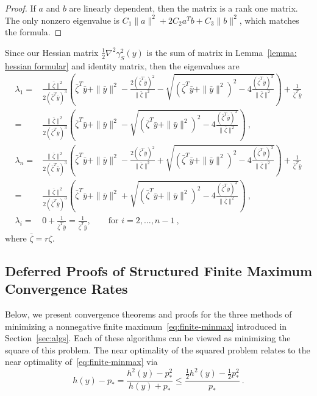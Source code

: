 \documentclass[sn-mathphys,Numbered]{sn-jnl}%
\begin{document}
\begin{appendices}
{\begin{proof}
    If $a$ and $b$ are linearly dependent, then the matrix is a rank one matrix. The only nonzero eigenvalue is $ C_1\|a\|^2+2C_2a^Tb+C_3\|b\|^2$, which matches the formula.
\end{proof}
Since our Hessian matrix $\frac{1}{2}\nabla ^2 \gamma_S^2(y)$ is the sum of matrix in Lemma~\ref{lemma: hessian formular} and identity matrix, then the eigenvalues are
\begin{align*}
    \lambda_1 =&\frac{\|\bar \zeta\|^2}{2(\bar \zeta^T \bar y)^3}\left(\bar \zeta^T \bar y+\|\bar y\|^2-\frac{2(\bar \zeta ^T \bar y)^2}{\|\bar \zeta\|^2}-\sqrt{(\bar \zeta ^T\bar y+\|\bar y\|^2)^2-4\frac{(\bar \zeta^T \bar y)^3}{\|\bar \zeta\|^2}}\right)+\frac{1}{\bar \zeta^T \bar y}  \\
    =&\frac{\|\bar \zeta\|^2}{2(\bar \zeta^T \bar y)^3}\left(\bar \zeta^T \bar y+\|\bar y\|^2-\sqrt{(\bar \zeta ^T\bar y+\|\bar y\|^2)^2-4\frac{(\bar \zeta^T \bar y)^3}{\|\bar \zeta\|^2}}\right) \ , \\
    \lambda_n =& \frac{\|\bar \zeta\|^2}{2(\bar \zeta^T \bar y)^3}\left(\bar \zeta^T \bar y+\|\bar y\|^2-\frac{2(\bar \zeta ^T \bar y)^2}{\|\bar \zeta\|^2}+\sqrt{(\bar \zeta ^T\bar y+\|\bar y\|^2)^2-4\frac{(\bar \zeta^T \bar y)^3}{\|\bar \zeta\|^2}}\right)+\frac{1}{\bar \zeta^T \bar y} \\
    =&\frac{\|\bar \zeta\|^2}{2(\bar \zeta^T \bar y)^3}\left(\bar \zeta^T \bar y+\|\bar y\|^2+\sqrt{(\bar \zeta ^T\bar y+\|\bar y\|^2)^2-4\frac{(\bar \zeta^T \bar y)^3}{\|\bar \zeta\|^2}}\right) \ , \\
    \lambda_i=& 0 +\frac{1}{\bar \zeta^T \bar y} =\frac{1}{\bar \zeta^T \bar y}, \qquad \text{for }i=2,...,n-1 \ ,
\end{align*}
where $\bar \zeta = r\zeta$.

\subsection{Deferred Proofs of Structured Finite Maximum Convergence Rates}\label{app:convergence-proofs}
Below, we present convergence theorems and proofs for the three methods of minimizing a nonnegative finite maximum~\eqref{eq:finite-minmax} introduced in Section~\ref{sec:algs}. Each of these algorithms can be viewed as minimizing the square of this problem. The near optimality of the squared problem relates to the near optimality of~\eqref{eq:finite-minmax} via
\begin{equation}\label{eq:Squared-Optimality-Conversion}
    h(y)-p_* = \frac{h^2(y)-p_*^2}{h(y)+p_*}\leq \frac{\frac{1}{2}h^2(y)-\frac{1}{2}p_*^2}{p_*} \ .
\end{equation}

}
\end{appendices}
\end{document}
